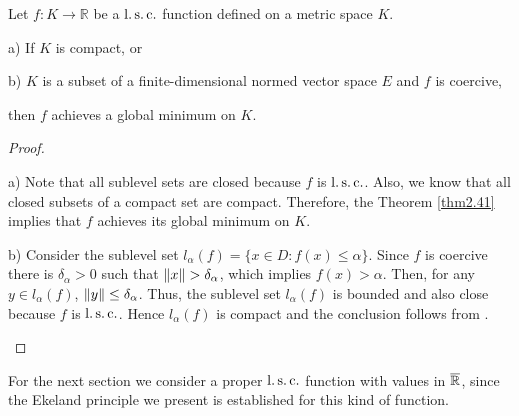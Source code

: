     \begin{corollary}
        Let $f : K \to \mathbb{R}$ be a $\operatorname{l.s.c.}$ function defined on
        a metric space $K$.
        \begin{asparaenum}
            \item[a)]
                If $K$ is compact, or
            \item[b)] $K$ is a subset of a finite-dimensional normed vector space
                        $E$ and $f$ is coercive,
        \end{asparaenum}
        then $f$ achieves a global minimum on $K$.
    \end{corollary}
    \begin{proof} \hspace{5cm} \\
        \begin{asparaenum}
            \item[a)]
                Note that all sublevel sets are closed because $f$ is $\operatorname{l.s.c.}$.
                Also, we know that all closed subsets of a compact set are compact. Therefore,
                the Theorem \eqref{thm2.41} implies that $f$ achieves its global minimum on $K$.
            \item[b)]
                Consider the sublevel set
                $l_{\alpha}(f) = \{ x \in D : f(x) \leq \alpha \}$. Since $f$ is
                coercive there is $\delta_{\alpha} > 0$ such that
                $\left\lVert x\right\rVert > \delta_{\alpha}$, which implies $f(x) > \alpha $.
                Then, for any $y \in l_{\alpha}(f)$, $\norm{y} \leq %
                \delta_{\alpha}$. Thus, the sublevel set $l_{\alpha}(f)$
                is bounded and also close because $f$ is $\operatorname{l.s.c.}$. Hence
                $l_{\alpha}(f)$ is compact and the conclusion follows from
                .
        \end{asparaenum}
    \end{proof}
    
    For the next section we consider a proper $\operatorname{l.s.c.}$ function with values in 
    $\overline{\mathbb{R}}$, since the Ekeland principle we present is established for this 
    kind of function. 
